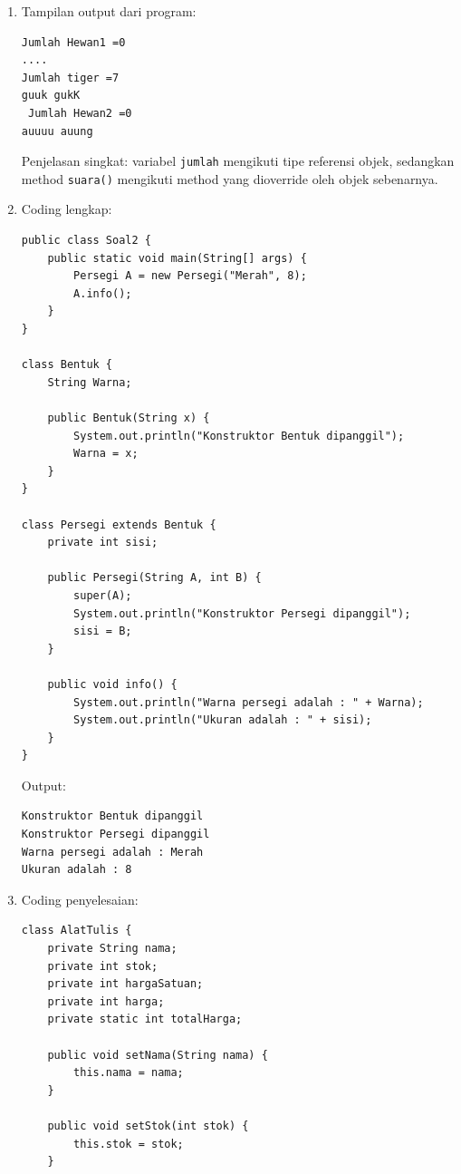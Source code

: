\documentclass[12pt,a4paper]{article}
\begin{document}
\begin{enumerate}[label=\arabic*.]
  \item Tampilan output dari program:

        \begin{verbatim}
Jumlah Hewan1 =0
....
Jumlah tiger =7
guuk gukK
 Jumlah Hewan2 =0
auuuu auung
\end{verbatim}

        Penjelasan singkat: variabel \texttt{jumlah} mengikuti tipe referensi objek,
        sedangkan method \texttt{suara()} mengikuti method yang dioverride oleh objek
        sebenarnya.

  \item Coding lengkap:

        \begin{verbatim}
public class Soal2 {
    public static void main(String[] args) {
        Persegi A = new Persegi("Merah", 8);
        A.info();
    }
}

class Bentuk {
    String Warna;

    public Bentuk(String x) {
        System.out.println("Konstruktor Bentuk dipanggil");
        Warna = x;
    }
}

class Persegi extends Bentuk {
    private int sisi;

    public Persegi(String A, int B) {
        super(A);
        System.out.println("Konstruktor Persegi dipanggil");
        sisi = B;
    }

    public void info() {
        System.out.println("Warna persegi adalah : " + Warna);
        System.out.println("Ukuran adalah : " + sisi);
    }
}
\end{verbatim}

        Output:

        \begin{verbatim}
Konstruktor Bentuk dipanggil
Konstruktor Persegi dipanggil
Warna persegi adalah : Merah
Ukuran adalah : 8
\end{verbatim}

  \item Coding penyelesaian:

        \begin{verbatim}
class AlatTulis {
    private String nama;
    private int stok;
    private int hargaSatuan;
    private int harga;
    private static int totalHarga;

    public void setNama(String nama) {
        this.nama = nama;
    }

    public void setStok(int stok) {
        this.stok = stok;
    }


\end{verbatim}
\end{enumerate}
\end{document}
